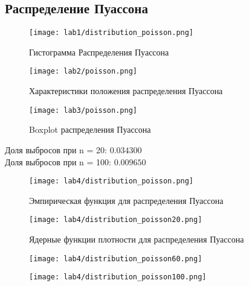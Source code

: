 \documentclass[a4]{article}
\begin{document}
\subsection{Распределение Пуассона}
	\begin{figure}[H]
	\caption{Гистограмма Распределения Пуассона}
	\texttt{[image: lab1/distribution\_poisson.png]}
	\end{figure}
	\begin{figure}[H]
	\caption{Характеристики положения распределения Пуассона}
	\texttt{[image: lab2/poisson.png]}
	\end{figure}
	\begin{figure}[H]
	\caption{Boxplot распределения Пуассона }
	\texttt{[image: lab3/poisson.png]}
	\end{figure}
	Доля выбросов при n = 20: $0.034300$\\
	Доля выбросов при n = 100: $0.009650$
	\begin{figure}[H]
	\caption{Эмпирическая функция для распределения Пуассона}
	\texttt{[image: lab4/distribution\_poisson.png]}
	\end{figure}
	\begin{figure}[H]
	\caption{Ядерные функции плотности для распределения Пуассона}
	\texttt{[image: lab4/distribution\_poisson20.png]}
	\end{figure}
	\begin{figure}[H]
	\texttt{[image: lab4/distribution\_poisson60.png]}
	\end{figure}
	\begin{figure}[H]
	\texttt{[image: lab4/distribution\_poisson100.png]}
	\end{figure}
\newpage
\end{document}
